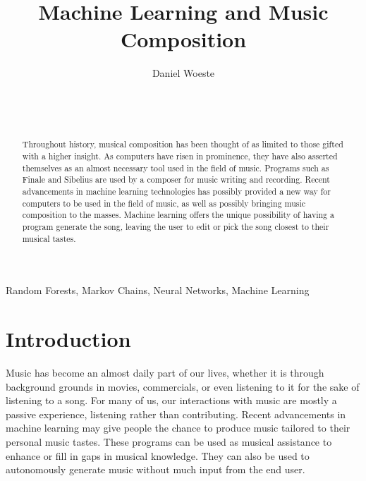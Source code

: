 \documentclass{sig-alternate}
\begin{document}

\title{Machine Learning and Music Composition}
\author{
\alignauthor
Daniel Woeste\\
	\\
	\\
	\\
}


\maketitle
\begin{abstract}
Throughout history, musical composition has been thought of as limited to those gifted with a higher insight. As computers have risen in prominence, they have also asserted themselves as an almost necessary tool used in the field of music. Programs such as Finale and Sibelius are used by a composer for music writing and recording. Recent advancements in machine learning technologies has possibly provided a new way for computers to be used in the field of music, as well as possibly bringing music composition to the masses. Machine learning offers the unique possibility of having a program generate the song, leaving the user to edit or pick the song closest to their musical tastes. 

\end{abstract}

\keywords
Random Forests, Markov Chains, Neural Networks, Machine Learning

\section{Introduction}
\label{sec:introduction}

Music has become an almost daily part of our lives, whether it is through background grounds in movies, commercials, or even listening to it for the sake of listening to a song. For many of us, our interactions with music are mostly a passive experience, listening rather than contributing. Recent advancements in machine learning may give people the chance to produce music tailored to their personal music tastes. These programs can be used as musical assistance to enhance or fill in gaps in musical knowledge. They can also be used to autonomously generate music without much input from the end user. 
\end{document}

